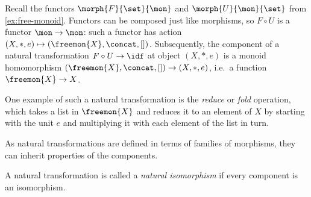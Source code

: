 \begin{example}[Reduce]
    Recall the functors \(\morph{F}{\set}{\mon}\) and \(\morph{U}{\mon}{\set}\)
    from \cref{ex:free-monoid}.
    Functors can be composed just like morphisms, so \(F \circ U\) is a
    functor \(\mon \to \mon\): such a functor has action \(
        (X, *, e) \mapsto (\freemon{X}, \concat, [])
    \).
    Subsequently, the component of a natural transformation \(
        F \circ U \to \idf
    \) at object \((X, *, e)\) is a monoid homomorphism \(
        (\freemon{X}, \concat, []) \to (X, *, e)
    \), i.e.\ a function \(\freemon{X} \to X\).

    One example of such a natural transformation is the \emph{reduce} or
    \emph{fold} operation, which takes a list in \(\freemon{X}\) and reduces it
    to an element of \(X\) by starting with the unit \(e\) and multiplying it
    with each element of the list in turn.
\end{example}

As natural transformations are defined in terms of families of morphisms, they
can inherit properties of the components.

\begin{definition}
    A natural transformation is called a \emph{natural isomorphism} if every
    component is an isomorphism.
\end{definition}